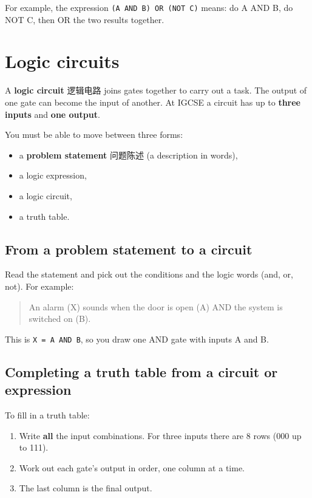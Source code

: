 \documentclass[11pt]{article}
\begin{document}
For example, the expression \texttt{(A AND B) OR (NOT C)} means: do A AND B, do NOT C, then OR the two results together.

\section*{Logic circuits}

A \textbf{logic circuit} 逻辑电路 joins gates together to carry out a task. The output of one gate can become the input of another. At IGCSE a circuit has up to \textbf{three inputs} and \textbf{one output}.

You must be able to move between three forms:

\begin{itemize}
\item a \textbf{problem statement} 问题陈述 (a description in words),

\item a logic expression,

\item a logic circuit,

\item a truth table.

\end{itemize}

\subsection*{From a problem statement to a circuit}

Read the statement and pick out the conditions and the logic words (and, or, not). For example:

\begin{quote}
An alarm (X) sounds when the door is open (A) AND the system is switched on (B).

\end{quote}

This is \texttt{X = A AND B}, so you draw one AND gate with inputs A and B.

\subsection*{Completing a truth table from a circuit or expression}

To fill in a truth table:

\begin{enumerate}
\item Write \textbf{all} the input combinations. For three inputs there are 8 rows (000 up to 111).

\item Work out each gate's output in order, one column at a time.

\item The last column is the final output.

\end{enumerate}
\end{document}
